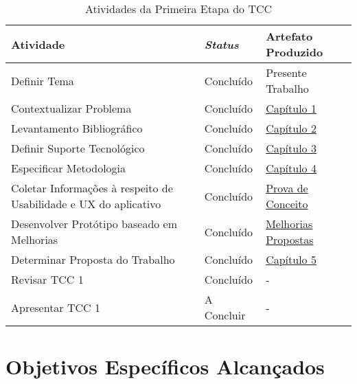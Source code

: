 \begin{table}[h!]
	\centering
	\caption{Atividades da Primeira Etapa do TCC}
	\label{tab09}
	\begin{tabularx}{\textwidth}{p{8cm}|p{2cm}|p{4cm}}
	\hline
    Atividade                                                        & \textit{Status}       & Artefato Produzido             \\ \hline
    Definir Tema                                                     & Concluído    & Presente Trabalho              \\
    Contextualizar Problema                                          & Concluído    & \hyperref[chap:Introducao]{Capítulo 1}                   \\
    Levantamento Bibliográfico                                       & Concluído    & \hyperref[chap:Referencial]{Capítulo 2}                     \\
    Definir Suporte Tecnológico                                      & Concluído    & \hyperref[chap:ReferencialTech]{Capítulo 3}                   \\
    Especificar Metodologia                                          & Concluído    & \hyperref[chap:Metodologia]{Capítulo 4}                     \\
    Coletar Informações à respeito de Usabilidade e UX do aplicativo & Concluído    & \hyperref[sec:Prova de Conceito]{Prova de Conceito} \\
    Desenvolver Protótipo baseado em Melhorias                       & Concluído    & \hyperref[sec:Melhorias Propostas]{Melhorias Propostas}         \\
    Determinar Proposta do Trabalho                                  & Concluído    & \hyperref[chap:Proposta]{Capítulo 5}                     \\
    Revisar TCC 1                                                    & Concluído    & -                              \\ 
    Apresentar TCC 1                                                 & A Concluir   & -                              \\ \hline
	\end{tabularx}
\end{table}

\section{Objetivos Específicos Alcançados}
\label{sec:Objetivos Especificos Alcancados}

